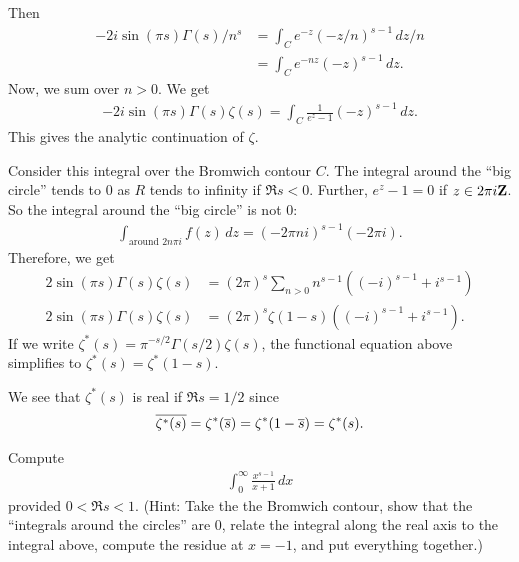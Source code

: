 \documentclass[11pt, oneside,margin=1in]{article}
\begin{document}
Then
\begin{align*}
	-2i \sin (\pi s) \Gamma(s) /n^s &= \int _C e^{-z}  (-z/n)^{s-1}\,dz/n\\
				      &= \int_C e^{-nz}  (-z)^{s-1}\, dz.
\end{align*}
Now, we sum over $n>0$. We get
\begin{align*}
-2 i \sin (\pi s) \Gamma (s) \zeta (s) = \int_C \frac{1}{e^z-1}  (-z)^{s-1} \, dz.	
\end{align*}
This gives the analytic continuation of $\zeta$.

Consider this integral over the Bromwich contour $C$. The integral around the ``big circle'' tends to $0$ as $R$ tends to infinity if $\Re s < 0 $. Further, $e^z-1=0$ if $z\in 2\pi i\mathbf Z$. So the integral around the ``big circle'' is not $0$: 
\begin{align*}
	\int_{\textrm{around $2n\pi i$}} f(z)\, dz =  (-2\pi n i)^{s-1}  (-2\pi i).
\end{align*}
Therefore, we get
\begin{align*}
	2\sin (\pi s)\Gamma  (s) \zeta (s) &=  (2\pi)^s \sum_{n>0} n^{s-1}  ((-i)^{s-1} + i^{s-1}) \\
	2\sin (\pi s)\Gamma  (s) \zeta (s) &= (2\pi)^s \zeta (1-s)((-i)^{s-1} + i^{s-1}). 
\end{align*}
If we write $\zeta^*(s) = \pi^{-s/2} \Gamma (s/2)\zeta (s)$, the functional equation above simplifies to $\zeta^*(s) = \zeta^* (1-s)$.

We see that $\zeta^*(s)$ is real if $\Re s = 1/2$ since
\begin{align*}
	\overline{\zeta^*(s)} = \zeta^* (\overline s) = \zeta^* (1-\overline s) = \zeta^* (s).
\end{align*}

\begin{exercise}\label{ibc_1}\text{}
Compute
\begin{align*}
	\int_0^\infty \frac{x^{s-1}}{x+1}\, dx
\end{align*}
provided $0<\Re s < 1$. (Hint: Take the the Bromwich contour, show that the ``integrals around the circles'' are $0$, relate the integral along the real axis to the integral above, compute the residue at $x=-1$, and put everything together.)
\end{exercise}
\end{document}
